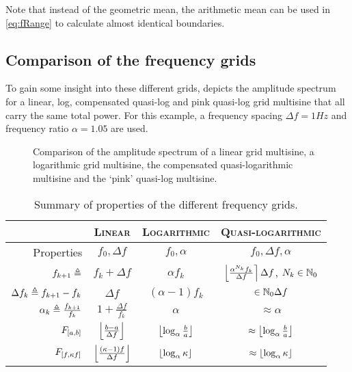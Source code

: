   Note that instead of the geometric mean, the arithmetic mean can be used in \eqref{eq:fRange} to calculate almost identical boundaries.

  \subsection{Comparison of the frequency grids}
  To gain some insight into these different grids,  depicts the amplitude spectrum for a linear, log, compensated quasi-log and pink quasi-log grid multisine that all carry the same total power.
  For this example, a frequency spacing $\Delta f = 1\unit{Hz}$ and frequency ratio $\alpha = 1.05$ are used.
  
  \begin{figure}[ht]
    \centering
      \setlength{}
      \setlength\figureheight{0.5\figurewidth}
    
    \caption[Amplitude spectrum for linear, logarithmic, quasi-logarithmic grids.]{Comparison of the amplitude spectrum of a linear grid multisine, a logarithmic grid multisine, the compensated quasi-logarithmic multisine and the `pink' quasi-log multisine.}%
    \label{fig:freqGrids}
  \end{figure}

  \begin{table}
  \centering
   \caption{Summary of  properties of the different frequency grids.}
    \begin{tabular}{rccc} 
    \toprule
     & \textsc{Linear} & \textsc{Logarithmic} & \textsc{Quasi-logarithmic} \\
    \midrule
    Properties 
       & $f_0, \Delta f$ 
       & $f_0, \alpha$ 
       & $f_0, \Delta f, \alpha$\\
    \midrule
    $f_{k+1} \triangleq$ 
       & $f_{k} + \Delta f$ 
       & $\alpha f_{k}$
       & $\left\lfloor \frac{\alpha^{N_k} f_k}{\Delta f} \right\rceil \Delta f$,   $N_k \in \mathbb{N}_{0}$
       \\[5pt]
    $\Delta f_k \triangleq f_{k+1} - f_k$ 
       & $\Delta f$
       & $(\alpha - 1) f_k$
       & $ \in \mathbb{N}_{0} \Delta f$ \\[5pt]
    $\alpha_k \triangleq \frac{f_{k+1}}{f_k}$ 
       & $1 + \frac{\Delta f}{f_k}$ 
       & $\alpha$ 
       & $\approx \alpha $ \\[5pt]
    $F_{\left[ a,b \right]}$
       & $\left\lfloor \frac{b - a}{\Delta f} \right\rfloor$
       & $\left\lfloor \log_{\alpha} \frac{b}{a} \right\rfloor$
       & $\approx \left\lfloor \log_{\alpha} \frac{b}{a} \right\rfloor$\\[5pt]
    $F_{\left[ f, \kappa f \right]}$
      & $\left\lfloor \frac{(\kappa - 1)f}{\Delta f} \right\rfloor$
      & $\left\lfloor \log_{\alpha} \kappa \right\rfloor$
      & $\approx \left\lfloor \log_{\alpha} \kappa \right\rfloor$\\[5pt]
    \bottomrule
    \end{tabular}
  \end{table}

